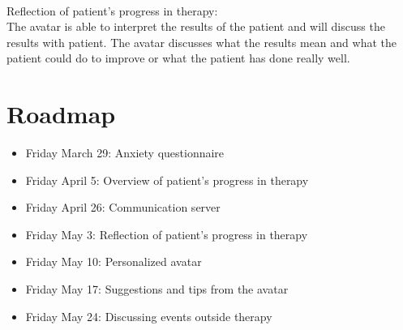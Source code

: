 \paragraph{}
Reflection of patient's progress in therapy: \\
The \gls{avatar} is able to interpret the results of the patient and will discuss the results with patient. The \gls{avatar} discusses what the results mean and what the patient could do to improve or what the patient has done really well.

\section{Roadmap}
\begin{itemize}
\item Friday March 29: Anxiety questionnaire	
\item Friday April 5: Overview of patient's progress in therapy
\item Friday April 26: Communication server
\item Friday May 3: Reflection of patient's progress in therapy
\item Friday May 10: Personalized \gls{avatar}
\item Friday May 17: Suggestions and tips from the \gls{avatar}	
\item Friday May 24: Discussing events outside therapy
\end{itemize}

